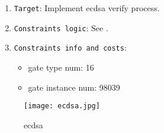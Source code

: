 
\begin{enumerate}
    \item \verb|Target|: Implement ecdsa verify process.
    \item \verb|Constraints logic|: See .
    \item \verb|Constraints info and costs|:
    \begin{itemize}
        \item gate type num: 16
        \item gate instance num: 98039
    \end{itemize}
\end{enumerate}

\begin{figure}[!ht]
    \centering
    \texttt{[image: ecdsa.jpg]}
    \caption{ecdsa}
    \label{fig:ecdsa}
\end{figure}
